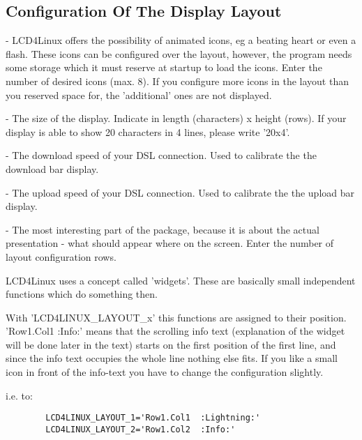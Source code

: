 \subsection{Configuration Of The Display Layout}

\begin{description}
  - LCD4Linux offers the possibility of animated icons, eg a beating heart or even
  a flash. These icons can be configured over the layout, however, the program
  needs some storage which it must reserve at startup to load the icons. Enter
  the number of desired icons (max. 8). If you configure more icons in the layout
  than you reserved space for, the 'additional' ones are not displayed.

  - The size of the display. Indicate in length (characters) x height (rows). If your
  display is able to show 20 characters in 4 lines, please write '20x4'.

  - The download speed of your DSL connection. Used to calibrate the
  the download bar display.
  
  - The upload speed of your DSL connection. Used to calibrate the
  the upload bar display.

  - The most interesting part of the package, because it is about the actual
  presentation - what should appear where on the screen. Enter the
  number of layout configuration rows.

  LCD4Linux uses a concept called 'widgets'. These are basically
  small independent functions which do something then.
  
  With 'LCD4LINUX\_LAYOUT\_x' this functions are assigned to their position. 
  'Row1.Col1  :Info:' means that the scrolling info text (explanation of the
  widget will be done later in the text) starts on the first position of the first line,
  and since the info text occupies the whole line nothing else fits. If you like a small icon
  in front of the info-text you have to change the configuration slightly.

  i.e. to:
\begin{example}
\begin{verbatim}
        LCD4LINUX_LAYOUT_1='Row1.Col1  :Lightning:'
        LCD4LINUX_LAYOUT_2='Row1.Col2  :Info:'
\end{verbatim}
\end{example}


\end{description}
